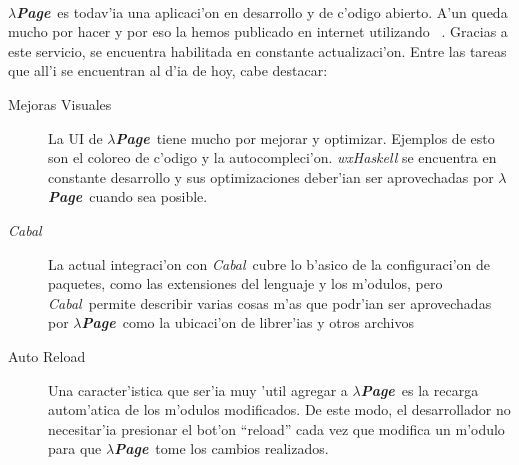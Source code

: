 \documentclass[a4paper]{article}
\newcommand{\hpage}{\textbf{\textsl{$\lambda$Page}}}
\newcommand{\cabal}{\textsl{Cabal}}
\begin{document}
\paragraph{}\hpage\ es todav'ia una aplicaci'on en desarrollo y de c'odigo abierto.  A'un queda mucho por hacer y por eso la hemos publicado en internet utilizando ~\cite{github}.  Gracias a este servicio, se encuentra habilitada  en constante actualizaci'on.  Entre las tareas que all'i se encuentran al d'ia de hoy, cabe destacar:
\begin{description}
	\item[Mejoras Visuales] La UI de \hpage\ tiene mucho por mejorar y optimizar.  Ejemplos de esto son el coloreo de c'odigo y la autocompleci'on.  \textsl{wxHaskell} se encuentra en constante desarrollo y sus optimizaciones deber'ian ser aprovechadas por \hpage\ cuando sea posible.
	\item[\cabal] La actual integraci'on con \cabal\ cubre lo b'asico de la configuraci'on de paquetes, como las extensiones del lenguaje y los m'odulos, pero \cabal\ permite describir varias cosas m'as que podr'ian ser aprovechadas por \hpage\ como la ubicaci'on de librer'ias y otros archivos
	\item[Auto Reload] Una caracter'istica que ser'ia muy 'util agregar a \hpage\ es la recarga autom'atica de los m'odulos modificados.  De este modo, el desarrollador no necesitar'ia presionar el bot'on ``reload'' cada vez que modifica un m'odulo para que \hpage\ tome los cambios realizados.
\end{description}
\end{document}
